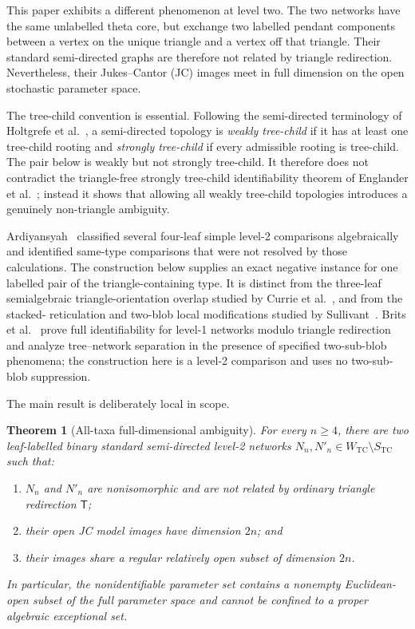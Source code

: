 \documentclass[11pt]{article}
\newtheorem{theorem}{Theorem}[section]
\theoremstyle{remark}
\newcommand{\TCw}{W_{\mathrm{TC}}}
\newcommand{\TCs}{S_{\mathrm{TC}}}
\newcommand{\Tmove}{\mathsf T}
\begin{document}
This paper exhibits a different phenomenon at level two.  The two networks
have the same unlabelled theta core, but exchange two labelled pendant
components between a vertex on the unique triangle and a vertex off that
triangle.  Their standard semi-directed graphs are therefore not related by
triangle redirection.  Nevertheless, their Jukes--Cantor (JC) images meet in
full dimension on the open stochastic parameter space.

The tree-child convention is essential.  Following the semi-directed
terminology of Holtgrefe et al.~\cite{HoltgrefeEtAl2026}, a semi-directed
topology is \emph{weakly tree-child} if it has at least one tree-child rooting
and \emph{strongly tree-child} if every admissible rooting is tree-child.  The
pair below is weakly but not strongly tree-child.  It therefore does not
contradict the triangle-free strongly tree-child identifiability theorem of
Englander et al.~\cite{EnglanderEtAl2026}; instead it shows that allowing all
weakly tree-child topologies introduces a genuinely non-triangle ambiguity.

Ardiyansyah~\cite{Ardiyansyah2021} classified several four-leaf simple
level-2 comparisons algebraically and identified same-type comparisons that
were not resolved by those calculations.  The construction below supplies an
exact negative instance for one labelled pair of the triangle-containing
type.
It is distinct from the three-leaf semialgebraic triangle-orientation overlap
studied by Currie et al.~\cite{CurrieEtAl2026}, and from the stacked-
reticulation and two-blob local modifications studied by
Sullivant~\cite{Sullivant2026}.  Brits et al.~\cite{BritsEtAl2026} prove full
identifiability for level-1 networks modulo triangle redirection and analyze
tree--network separation in the presence of specified two-sub-blob
phenomena; the construction here is a level-2 comparison and uses no
two-sub-blob suppression.

The main result is deliberately local in scope.

\begin{theorem}[All-taxa full-dimensional ambiguity]\label{thm:main}
For every $n\ge4$, there are two leaf-labelled binary standard
semi-directed level-2 networks $N_n,N'_n\in\TCw\setminus\TCs$ such that:
\begin{enumerate}[label=(\roman*)]
  \item $N_n$ and $N'_n$ are nonisomorphic and are not related by ordinary
        triangle redirection $\Tmove$;
  \item their open JC model images have dimension $2n$; and
  \item their images share a regular relatively open subset of dimension
        $2n$.
\end{enumerate}
In particular, the nonidentifiable parameter set contains a nonempty
Euclidean-open subset of the full parameter space and cannot be confined to a
proper algebraic exceptional set.
\end{theorem}
\end{document}
